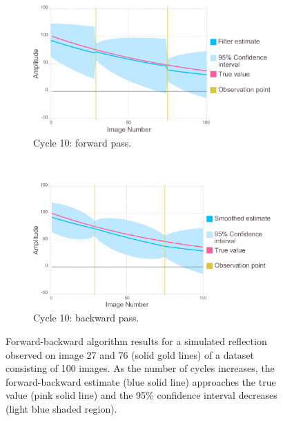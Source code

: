 \begin{figure}
    \ContinuedFloat
    \begin{subfigure}[b]{1.0\textwidth}
        \centering
        \includegraphics[width=\textwidth]{figures/datared/intDecSim_Filt10.pdf}
        \caption{Cycle 10: forward pass.}
        \label{fig:UKF simulation results - cycle 10 - good}
    \end{subfigure}
    \\
    \begin{subfigure}[b]{1.0\textwidth}
        \centering
        \includegraphics[width=\textwidth]{figures/datared/intDecSim10.pdf}
        \caption{Cycle 10: backward pass.}
        \label{fig:URTSS simulation results - cycle 10 - good}
    \end{subfigure}
    \caption{Forward-backward algorithm results for a simulated reflection observed on image 27 and 76 (solid gold lines) of a dataset consisting of 100 images.
    As the number of cycles increases, the forward-backward estimate (blue solid line) approaches the true value (pink solid line) and the 95\% confidence interval decreases (light blue shaded region).}
    \label{fig:forward-backward algorithm simulation results - good}
\end{figure}

